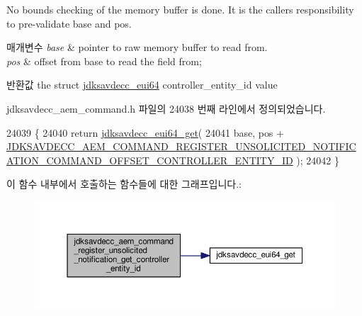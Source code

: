 No bounds checking of the memory buffer is done. It is the caller\textquotesingle{}s responsibility to pre-\/validate base and pos.


\begin{DoxyParams}{매개변수}
{\em base} & pointer to raw memory buffer to read from. \\
\hline
{\em pos} & offset from base to read the field from; \\
\hline
\end{DoxyParams}
\begin{DoxyReturn}{반환값}
the struct \hyperlink{structjdksavdecc__eui64}{jdksavdecc\+\_\+eui64} controller\+\_\+entity\+\_\+id value 
\end{DoxyReturn}


jdksavdecc\+\_\+aem\+\_\+command.\+h 파일의 24038 번째 라인에서 정의되었습니다.


\begin{DoxyCode}
24039 \{
24040     \textcolor{keywordflow}{return} \hyperlink{group__eui64_ga2652311a25a6b91cddbed75c108c7031}{jdksavdecc\_eui64\_get}(
24041         base, pos + 
      \hyperlink{group__command__register__unsolicited__notification_ga3a39544ad1cea90df3595800b8690c73}{JDKSAVDECC\_AEM\_COMMAND\_REGISTER\_UNSOLICITED\_NOTIFICATION\_COMMAND\_OFFSET\_CONTROLLER\_ENTITY\_ID}
       );
24042 \}
\end{DoxyCode}


이 함수 내부에서 호출하는 함수들에 대한 그래프입니다.\+:
\nopagebreak
\begin{figure}[H]
\begin{center}
\leavevmode
\includegraphics[width=350pt]{group__command__register__unsolicited__notification_gac6b19ad324e789d53ead772b5a44b161_cgraph}
\end{center}
\end{figure}


